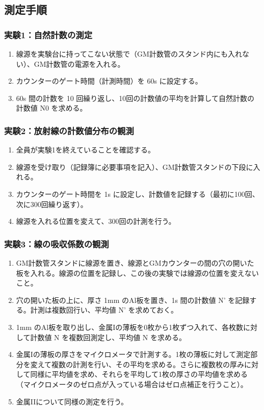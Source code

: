 \documentclass[a4paper,10pt]{jsarticle}
\begin{document}
\subsection{測定手順}

\subsubsection{実験1：自然計数の測定}
\begin{enumerate}
    \item 線源を実験台に持ってこない状態で（GM計数管のスタンド内にも入れない）、GM計数管の電源を入れる。
    \item カウンターのゲート時間（計測時間）を 60s に設定する。
    \item 60s 間の計数を 10 回繰り返し、10回の計数値の平均を計算して自然計数の計数値 N0 を求める。
\end{enumerate}

\subsubsection{実験2：放射線の計数値分布の観測}
\begin{enumerate}
    \item 全員が実験1を終えていることを確認する。
    \item 線源を受け取り（記録簿に必要事項を記入）、GM計数管スタンドの下段に入れる。
    \item カウンターのゲート時間を 1s に設定し、計数値を記録する（最初に100回、次に300回繰り返す）。
    \item 線源を入れる位置を変えて、300回の計測を行う。
\end{enumerate}

\subsubsection{実験3：線の吸収係数の観測}
\begin{enumerate}
    \item GM計数管スタンドに線源を置き、線源とGMカウンターの間の穴の開いた板を入れる。線源の位置を記録し、この後の実験では線源の位置を変えないこと。
    \item 穴の開いた板の上に、厚さ 1mm のAl板を置き、1s 間の計数値 N' を記録する。計測は複数回行い、平均値 N' を求めておく。
    \item 1mm のAl板を取り出し、金属Iの薄板を0枚から1枚ずつ入れて、各枚数に対して計数値 N を複数回測定し、平均値 N を求める。
    \item 金属Iの薄板の厚さをマイクロメータで計測する。1枚の薄板に対して測定部分を変えて複数の計測を行い、その平均を求める。さらに複数枚の厚みに対して同様に平均値を求め、それらを平均して1枚の厚さの平均値を求める（マイクロメータのゼロ点が入っている場合はゼロ点補正を行うこと）。
    \item 金属IIについて同様の測定を行う。
\end{enumerate}
\end{document}

